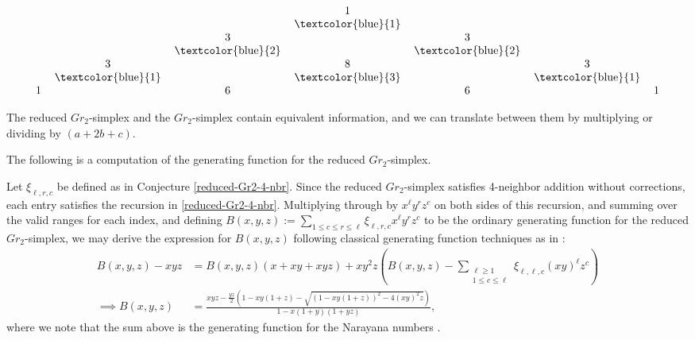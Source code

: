 \documentclass[12 pt]{article}
\theoremstyle{plain}
\theoremstyle{plain}
\theoremstyle{plain}
\theoremstyle{plain}
\theoremstyle{plain}
\theoremstyle{plain}
\theoremstyle{plain}
\theoremstyle{plain}
\theoremstyle{plain}
\theoremstyle{plain}
\theoremstyle{remark}
\theoremstyle{remark}
\theoremstyle{definition}
\theoremstyle{definition}
\theoremstyle{definition}
\theoremstyle{definition}
\theoremstyle{definition}
\theoremstyle{definition}
\begin{document}
$$
\begin{tabular}{cccccccccc}
&&&1&&\\
&&&\textcolor{blue}{1}\\
&&3&&3&\\
&&\textcolor{blue}{2}&&\textcolor{blue}{2}\\
&3&&8&&3\\
&\textcolor{blue}{1}&&\textcolor{blue}{3}&&\textcolor{blue}{1}\\
1&&6&&6&&1
\end{tabular}
$$

The reduced $Gr_2$-simplex and the $Gr_2$-simplex contain equivalent information, and we can translate between them by multiplying or dividing by $(a+2b+c)$. 

The following is a computation of the generating function for the reduced $Gr_2$-simplex.

Let $\xi_{\ell,r,c}$ be defined as in Conjecture \ref{reduced-Gr2-4-nbr}. Since the reduced $Gr_{2}$-simplex satisfies 4-neighbor addition without corrections, each entry satisfies the recursion in \ref{reduced-Gr2-4-nbr}.
Multiplying through by $x^\ell y^r z^c$ on both sides of this recursion, and summing over the valid ranges for each index, and defining $B(x,y,z) := \sum\limits_{1 \leq c \leq r \leq \ell} \xi_{\ell,r,c} x^\ell y^r z^c$ to be the ordinary generating function for the reduced $Gr_{2}$-simplex, we may derive the expression for $B(x,y,z)$ following classical generating function techniques as in \cite{W}:
\begin{align*}
B(x,y,z)-xyz
&= B(x,y,z)(x+xy+xyz)+xy^2z \left( B(x,y,z)-\sum_{\substack{\ell \geq 1\\ 1 \leq c \leq \ell}} \xi_{\ell,\ell,c}(xy)^{\ell}z^{c}\right)\\
\implies B(x,y,z) &= \frac{xyz - \frac{yz}{2}\left(1-xy(1+z)-\sqrt{(1-xy(1+z))^2-4(xy)^2z}\right)}{1-x(1+y)(1+yz)},
\end{align*}
where we note that the sum above is the generating function for the Narayana numbers \cite{OEISNarayana}.
\end{document}
